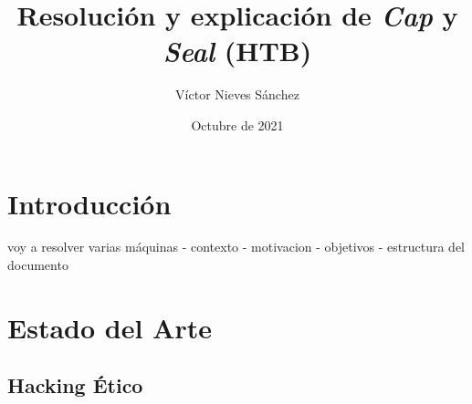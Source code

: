 \documentclass[a4paper, 12pt]{article} %
\author{Víctor Nieves Sánchez}
\date{Octubre de 2021}
\title{Resolución y explicación de \textit{Cap} y \textit{Seal} (\acrshort{HTB})}
\begin{document}
\maketitle
\null
\newpage
\begin{otherlanguage}{spanish}



    \newpage
    \tableofcontents

    \newpage
    \listoffigures

    \newpage
    \renewcommand{\listtablename}{Lista de Tablas}
    \listoftables

    \newpage
    \lstlistoflistings

    \newpage
    \printglossary[type=\acronymtype]

    \newpage
    \begin{abstract}
        \normalsize
        
    \end{abstract}

    \newpage
    \renewcommand{\spanishabstractname}{Abstract}
    \begin{abstract}
        \normalsize
        
    \end{abstract}
    \newpage

    \section{Introducción}
    voy a resolver varias máquinas
    - contexto
    - motivacion
    - objetivos
    - estructura del documento

    \newpage
    \section{Estado del Arte}

    \subsection{Hacking Ético}
    


\end{otherlanguage}
\end{document}
